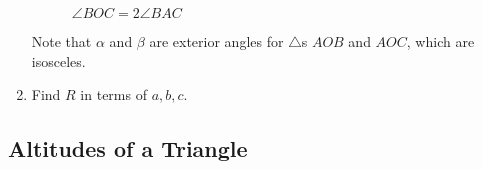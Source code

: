 \begin{enumerate}[label=\arabic*.,ref=\thesubsection.\theenumi]
\begin{figure}[!ht]
	\begin{center}
		
		\resizebox{\columnwidth}{!}{}
	\end{center}
	\caption{$\angle BOC = 2\angle BAC$}
	\label{ch3_perp_bisector_circ}	
\end{figure}
%
\solution Note that $\alpha$ and $\beta $ are exterior angles for $\triangle$s $AOB$ and $AOC$, which are isosceles.
%
\item Find $R$ in terms of $a, b, c$.
\end{enumerate}

\subsection{Altitudes of a Triangle}
\renewcommand{\theequation}{\theenumi}
